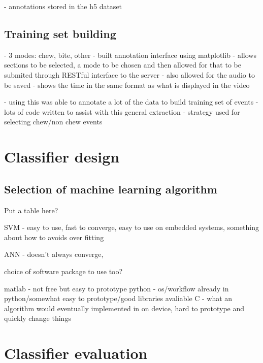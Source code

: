 
- annotations stored in the h5 dataset


\subsection{Training set building}

- 3 modes: chew, bite, other
- built annotation interface using matplotlib
    - allows sections to be selected, a mode to be chosen and then allowed for that to be submited through RESTful interface to the server
- also allowed for the audio to be saved
- shows the time in the same format as what is displayed in the video

- using this was able to annotate a lot of the data to build training set of events
- lots of code written to assist with this general extraction
- strategy used for selecting chew/non chew events

\section{Classifier design}

\subsection{Selection of machine learning algorithm}

Put a table here?

SVM - easy to use, fast to converge, easy to use on embedded systems, something about how to avoids over fitting

ANN - doesn't always converge, 


choice of software package to use too?

matlab - not free but easy to prototype
python - os/workflow already in python/somewhat easy to prototype/good libraries avaliable
C - what an algorithm would eventually implemented in on device, hard to prototype and quickly change things


\section{Classifier evaluation}
